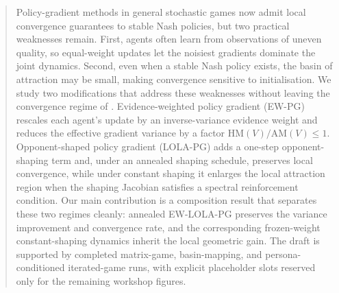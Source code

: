 \documentclass{article}
\theoremstyle{plain}
\theoremstyle{definition}
\theoremstyle{remark}
\newcommand{\HM}{\mathrm{HM}}
\newcommand{\AM}{\mathrm{AM}}
\begin{document}

\printAffiliationsAndNotice{}

\begin{abstract}
Policy-gradient methods in general stochastic games now admit local convergence guarantees to stable Nash policies, but two practical weaknesses remain. First, agents often learn from observations of uneven quality, so equal-weight updates let the noisiest gradients dominate the joint dynamics. Second, even when a stable Nash policy exists, the basin of attraction may be small, making convergence sensitive to initialisation. We study two modifications that address these weaknesses without leaving the convergence regime of \citet{giannou2022convergence}. Evidence-weighted policy gradient (EW-PG) rescales each agent's update by an inverse-variance evidence weight and reduces the effective gradient variance by a factor $\HM(V)/\AM(V)\leq 1$. Opponent-shaped policy gradient (LOLA-PG) adds a one-step opponent-shaping term and, under an annealed shaping schedule, preserves local convergence, while under constant shaping it enlarges the local attraction region when the shaping Jacobian satisfies a spectral reinforcement condition. Our main contribution is a composition result that separates these two regimes cleanly: annealed EW-LOLA-PG preserves the variance improvement and convergence rate, and the corresponding frozen-weight constant-shaping dynamics inherit the local geometric gain. The draft is supported by completed matrix-game, basin-mapping, and persona-conditioned iterated-game runs, with explicit placeholder slots reserved only for the remaining workshop figures.
\end{abstract}
\end{document}
